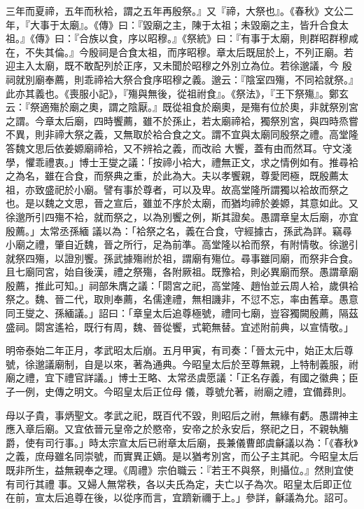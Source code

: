 \begin{pinyinscope}
 三年而夏禘，五年而秋袷，謂之五年再殷祭。』又『禘，大祭也』。《春秋》文公二年，『大事于太廟』。《傳》曰：『毀廟之主，陳于太祖；未毀廟之主，皆升合食太祖。』《傳》曰：『合族以食，序以昭穆。』《祭統》曰：『有事于太廟，則群昭群穆咸在，不失其倫。』今殷祠是合食太祖，而序昭穆。章太后既屈於上，不列正廟。若迎主入太廟，既不敢配列於正序，又未聞於昭穆之外別立為位。若徐邈議，今
 殷祠就別廟奉薦，則乖禘袷大祭合食序昭穆之義。邈云：『陰室四殤，不同袷就祭。』此亦其義也。《喪服小記》，『殤與無後，從祖祔食』。《祭法》，『王下祭殤』。鄭玄云：『祭適殤於廟之奧，謂之陰厭。』既從祖食於廟奧，是殤有位於奧，非就祭別宮之謂。今章太后廟，四時饗薦，雖不於孫止，若太廟禘袷，獨祭別宮，與四時烝嘗不異，則非禘大祭之義，又無取於袷合食之文。謂不宜與太廟同殷祭之禮。高堂隆答魏文思后依姜嫄廟禘袷，又不辨袷之義，而改祫
 大饗，蓋有由而然耳。守文淺學，懼乖禮衷。」博士王燮之議：「按禘小袷大，禮無正文，求之情例如有。推尋袷之為名，雖在合食，而祭典之重，於此為大。夫以孝饗親，尊愛罔極，既殷薦太祖，亦致盛祀於小廟。譬有事於尊者，可以及卑。故高堂隆所謂獨以袷故而祭之也。是以魏之文思，晉之宣后，雖並不序於太廟，而猶均禘於姜嫄，其意如此。又徐邈所引四殤不袷，就而祭之，以為別饗之例，斯其證矣。愚謂章皇太后廟，亦宜殷薦。」太常丞孫緬
 議以為：「袷祭之名，義在合食，守經據古，孫武為詳。竊尋小廟之禮，肇自近魏，晉之所行，足為前準。高堂隆以袷而祭，有附情敬。徐邈引就祭四殤，以證別饗。孫武據殤祔於祖，謂廟有殤位。尋事雖同廟，而祭非合食。且七廟同宮，始自後漢，禮之祭殤，各附厥祖。既豫袷，則必異廟而祭。愚謂章廟殷薦，推此可知。」祠部朱膺之議：「閟宮之祀，高堂隆、趙怡並云周人袷，歲俱袷祭之。魏、晉二代，取則奉薦，名儒達禮，無相譏非，不愆不忘，率由舊章。愚意
 同王燮之、孫緬議。」詔曰：「章皇太后追尊極號，禮同七廟，豈容獨闕殷薦，隔茲盛祠。閟宮遙袷，既行有周，魏、晉從饗，式範無替。宜述附前典，以宣情敬。」



 明帝泰始二年正月，孝武昭太后崩。五月甲寅，有司奏：「晉太元中，始正太后尊號，徐邈議廟制，自是以來，著為通典。今昭皇太后於至尊無親，上特制義服，祔廟之禮，宜下禮官詳議。」博士王略、太常丞虞愿議：「正名存義，有國之徽典；臣子一例，史傳之明文。今昭皇太后正位母
 儀，尊號允著，祔廟之禮，宜備彞則。



 母以子貴，事炳聖文。孝武之祀，既百代不毀，則昭后之祔，無緣有虧。愚謂神主應入章后廟。又宜依晉元皇帝之於愍帝，安帝之於永安后，祭祀之日，不親執觴爵，使有司行事。」時太宗宣太后已祔章太后廟，長兼儀曹郎虞龢議以為：「《春秋》之義，庶母雖名同崇號，而實異正嫡。是以猶考別宮，而公子主其祀。今昭皇太后既非所生，益無親奉之理。《周禮》宗伯職云：『若王不與祭，則攝位。』然則宜使有司行其禮
 事。又婦人無常秩，各以夫氏為定，夫亡以子為次。昭皇太后即正位在前，宣太后追尊在後，以從序而言，宜躋新禰于上。」參詳，龢議為允。詔可。




\end{pinyinscope}
